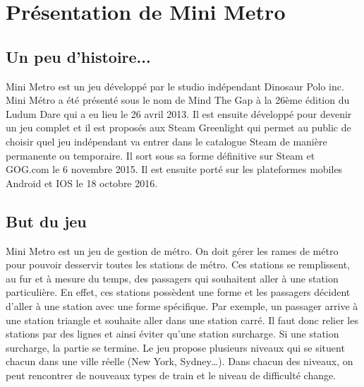 \documentclass[report, backcover, french, nodocumentinfo]{upmethodology-document}
\begin{document}
	\upmdocumentsummary{}
	\upmdocumentauthors{}
	\upmdocumentinformedpeople{}
	\upmpublicationpage{}

	\tableofcontents{}
	\listoffigures{}

	\newpage{}
	\chapter{Présentation de Mini Metro}
		\section{Un peu d'histoire...}
			\p{}
				Mini Metro est un jeu développé par le studio indépendant Dinosaur Polo inc. Mini Métro a été présenté sous le nom de Mind The Gap à la 26ème édition du Ludum Dare qui a eu lieu le 26 avril 2013. Il est ensuite développé pour devenir un jeu complet et il est proposés aux Steam Greenlight qui permet au public de choisir quel jeu indépendant va entrer dans le catalogue Steam de manière permanente ou temporaire. Il sort sous sa forme définitive sur Steam et GOG.com le 6 novembre 2015. Il est ensuite porté sur les plateformes mobiles Android et IOS le 18 octobre 2016.
		\section{But du jeu}
			\p{}
				Mini Metro est un jeu de gestion de métro. On doit gérer les rames de métro pour pouvoir desservir toutes les stations de métro. Ces stations se remplissent, au fur et à mesure du temps, des passagers qui souhaitent aller à une station particulière. En effet, ces stations possèdent une forme et les passagers décident d'aller à une station avec une forme spécifique. Par exemple, un passager arrive à une station triangle et souhaite aller dans une station carré. Il faut donc relier les stations par des lignes et ainsi éviter qu’une station surcharge. Si une station surcharge, la partie se termine.
			\p{}
				Le jeu propose plusieurs niveaux qui se situent chacun dans une ville réelle (New York, Sydney\ldots). Dans chacun des niveaux, on peut rencontrer de nouveaux types de train et le niveau de difficulté change.
\end{document}
